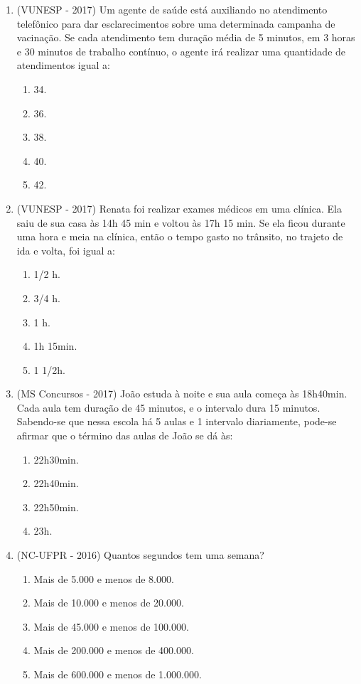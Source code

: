 \begin{enumerate}[1)]
 \item (VUNESP - 2017) Um agente de saúde está auxiliando no atendimento telefônico para dar esclarecimentos sobre uma determinada campanha de vacinação. Se cada atendimento tem duração média de 5 minutos, em 3 horas e 30 minutos de trabalho contínuo, o agente irá realizar uma quantidade de atendimentos igual a:
 \begin{enumerate}
 \item 34.
 \item 36.
 \item 38.
 \item 40.
 \item 42.
 \end{enumerate}
 
 \item (VUNESP - 2017) Renata foi realizar exames médicos em uma clínica. Ela saiu de sua casa às 14h 45 min e voltou às 17h 15 min. Se ela ficou durante uma hora e meia na clínica, então o tempo gasto no trânsito, no trajeto de ida e volta, foi igual a:
 \begin{enumerate}
 \item 1/2 h.
 \item 3/4 h.
 \item 1 h.
 \item 1h 15min.
 \item 1 1/2h.
 \end{enumerate}
 
 \item (MS Concursos - 2017) João estuda à noite e sua aula começa às 18h40min. Cada aula tem duração de 45 minutos, e o intervalo dura 15 minutos. Sabendo-se que nessa escola há 5 aulas e 1 intervalo diariamente, pode-se afirmar que o término das aulas de João se dá às:
 \begin{enumerate}
 \item 22h30min.
 \item 22h40min.
 \item 22h50min.
 \item 23h.
 \end{enumerate}
 
 \item (NC-UFPR - 2016) Quantos segundos tem uma semana? 
 \begin{enumerate}
 \item Mais de 5.000 e menos de 8.000. 
 \item Mais de 10.000 e menos de 20.000. 
 \item Mais de 45.000 e menos de 100.000. 
 \item Mais de 200.000 e menos de 400.000. 
 \item Mais de 600.000 e menos de 1.000.000. 
 \end{enumerate}
 

\end{enumerate}
